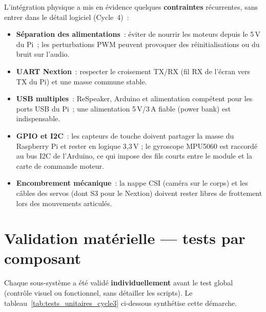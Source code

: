 \documentclass[a4paper,12pt]{report}
\begin{document}
	L'intégration physique a mis en évidence quelques \textbf{contraintes}
	récurrentes, sans entrer dans le détail logiciel (Cycle~4)~:
	\begin{itemize}
		\item \textbf{Séparation des alimentations}~: éviter de nourrir les moteurs
		depuis le 5\,V du Pi~; les perturbations PWM peuvent provoquer des
		réinitialisations ou du bruit sur l'audio.
		\item \textbf{UART Nextion}~: respecter le croisement TX/RX (fil RX de
		l'écran vers TX du Pi) et une masse commune stable.
		\item \textbf{USB multiples}~: ReSpeaker, Arduino et alimentation
		compétent pour les ports USB du Pi~; une alimentation 5\,V/3\,A fiable
		(power bank) est indispensable.
		\item \textbf{GPIO et I2C}~: les capteurs de touche doivent partager la masse
		du Raspberry Pi et rester en logique 3{,}3\,V ; le gyroscope MPU5060 est
		raccordé au bus I2C de l'Arduino, ce qui impose des fils courts entre le
		module et la carte de commande moteur.
		\item \textbf{Encombrement mécanique}~: la nappe CSI (caméra sur le corps)
		et les câbles des servos (dont S3 pour le Nextion) doivent rester libres
		de frottement lors des mouvements articulés.
	\end{itemize}
	
	\section{Validation matérielle — tests par composant}
	
	Chaque sous-système a été validé \textbf{individuellement} avant le test
	global (contrôle visuel ou fonctionnel, sans détailler les scripts).
	Le tableau~\ref{tab:tests_unitaires_cycle3} ci-dessous synthétise cette
	démarche.
	
\end{document}
